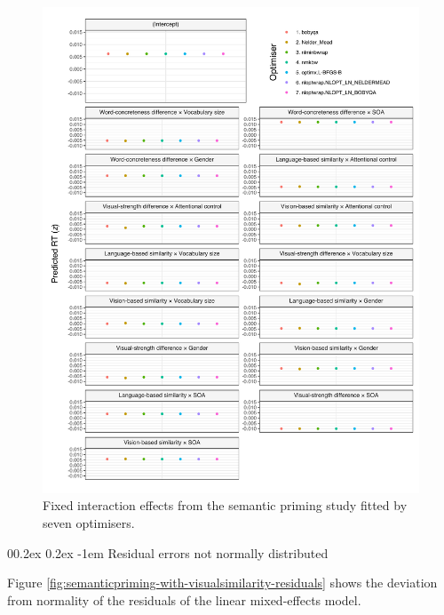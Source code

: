 \documentclass[
  12pt,
  man,floatsintext]{apa7}
\makeatletter
\let\oldparagraph\paragraph
\renewcommand{\paragraph}[1]{\oldparagraph{#1}\mbox{}}
\renewcommand{\paragraph}{\@startsection{paragraph}{4}{\parindent}%
  {0\baselineskip \@plus 0.2ex \@minus 0.2ex}%
  {-1em}%
  {\normalfont\normalsize\bfseries\itshape\typesectitle}}
\makeatother
\begin{document}
\begin{figure}

{\centering \includegraphics[width=1\linewidth]{../semanticpriming/analysis_with_visualsimilarity/model_diagnostics/plots/interactions_semanticpriming_with_visualsimilarity_allFit_convergence} 

}

\caption{Fixed interaction effects from the semantic priming study fitted by seven optimisers.}\label{fig:interactions-semanticpriming-with-visualsimilarity-allFit-convergence}
\end{figure}

\hypertarget{residual-errors-not-normally-distributed-2}{%
\paragraph{Residual errors not normally distributed}\label{residual-errors-not-normally-distributed-2}}

Figure \ref{fig:semanticpriming-with-visualsimilarity-residuals} shows the deviation from normality of the residuals of the linear mixed-effects model.
\end{document}
